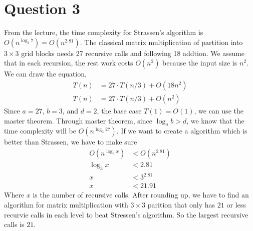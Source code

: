 \documentclass{article}
\begin{document}
\section*{Question 3}
From the lecture, the time complexity for Strassen's algorithm is $O(n^{\log_2 7}) = O(n^{2.81})$. The classical matrix multiplication of partition into $3 \times 3$
grid blocks needs 27 recursive calls and following 18 addtion. We assume that in each recursion, the rest work costs $O(n^2)$ because the input size is $n^2$. We can draw the equation,
\begin{align}
    T(n) &= 27 \cdot T(n/3) + O(18n^2) \nonumber \\
    T(n) &= 27 \cdot T(n/3) + O(n^2) \nonumber
\end{align}
Since $a = 27$, $b = 3$, and $d = 2$, the base case $T(1) = O(1)$, we can use the master theorem. Through master theorem, since $\log_a b > d$, we know that the time complexity will be $O(n^{\log_3 27})$. If we want to create a algorithm which is better than Strassen, we have 
to make sure 
\begin{align}
    O(n^{\log_3 x}) &< O(n^{2.81}) \nonumber \\
    \log_3 x &< 2.81 \nonumber \\
    x &< 3^{2.81} \nonumber\\
    x &< 21.91 \nonumber
\end{align}
Where $x$ is the number of recursive calls. After rounding up, we have to find an algorithm for matrix multiplication with $3\times 3$ parition that only has
$21$ or less recurvie calls in each level to beat Stressen's algorithm. So the largest recursive calls is $21$.
\end{document}
